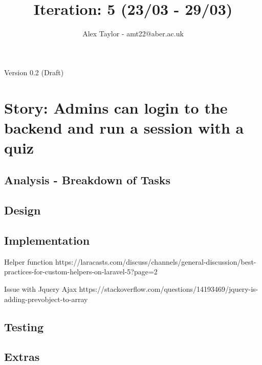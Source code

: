 \documentclass{article}
\title{Iteration: 5 (23/03 - 29/03)}
\author{Alex Taylor - amt22@aber.ac.uk}
\begin{document}
\maketitle
\begin{center}
	Version 0.2 (Draft)
\end{center}
\tableofcontents
\thispagestyle{empty}
\newpage

\section{Story: Admins can login to the backend and run a session with a quiz}
\subsection{Analysis - Breakdown of Tasks}
\subsection{Design}
\subsection{Implementation}
Helper function https://laracasts.com/discuss/channels/general-discussion/best-practices-for-custom-helpers-on-laravel-5?page=2

Issue with Jquery Ajax https://stackoverflow.com/questions/14193469/jquery-is-adding-prevobject-to-array
\subsection{Testing}
\subsection{Extras}
\newpage

%
%
\end{document}
